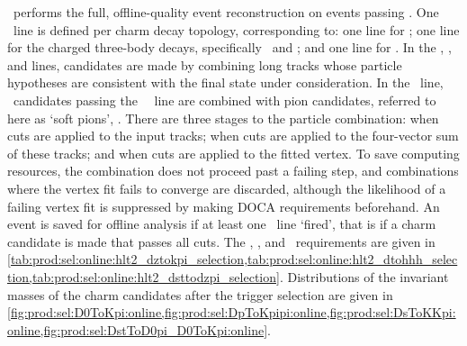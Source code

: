 \hlttwo\ performs the full, offline-quality event reconstruction on events 
passing \hltone.
One \hlttwo\ line is defined per charm decay topology, corresponding to: one 
line for \DzToKpi; one line for the charged three-body decays, specifically 
\DpToKpipi\ and \DspToKKpi; and one line for \DstToDzpi.
In the \PDzero, \PDplus, and \PDsplus lines, candidates are made by combining 
long tracks whose particle hypotheses are consistent with the final state under 
consideration.
In the \PDstarp\ line, \PDzero\ candidates passing the \PDzero\ \hlttwo\ line 
are combined with pion candidates, referred to here as `soft pions', 
\Ppiplussoft.
There are three stages to the particle combination: when cuts are applied to 
the input tracks; when cuts are applied to the four-vector sum of these tracks; 
and when cuts are applied to the fitted vertex.
To save computing resources, the combination does not proceed past a failing 
step, and combinations where the vertex fit fails to converge are discarded, 
although the likelihood of a failing vertex fit is suppressed by making 
\ac{DOCA} requirements beforehand.
An event is saved for offline analysis if at least one \hlttwo\ line `fired', 
that is if a charm candidate is made that passes all cuts.
The \DzToKpi, \DTohhh, and \DstToDzpi\ requirements are given in 
\cref{tab:prod:sel:online:hlt2_dztokpi_selection,tab:prod:sel:online:hlt2_dtohhh_selection,tab:prod:sel:online:hlt2_dsttodzpi_selection}.
Distributions of the invariant masses of the charm candidates after the trigger 
selection are given in 
\cref{fig:prod:sel:D0ToKpi:online,fig:prod:sel:DpToKpipi:online,fig:prod:sel:DsToKKpi:online,fig:prod:sel:DstToD0pi_D0ToKpi:online}.

\begin{table}
  \caption{%
    List of fills used in the analysis, along with the integrated luminosity 
    \intlumi, the \lzero\ \nobias\ rate, and the corresponding effective 
    \lzero\ efficiency (``eff.'') for each fill.
  }
  \label{tab:prod:sel:online:l0_nobias_rateeff}
  \centering
  
\end{table}

\begin{table}
  \caption{%
    Requirements made on the track that fires the \hltone\ trigger line.
  }
  \label{tab:prod:sel:online:hlt1_selection}
  \centering
  
\end{table}

\begin{table}
  \caption{%
    Requirements made in the \hlttwo\ \DzToKpi\ selection.
    The track \chisq\ criterion is applied in the reconstruction and listed 
    here for completeness.
  }
  \label{tab:prod:sel:online:hlt2_dztokpi_selection}
  \centering
  
\end{table}


